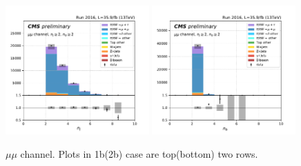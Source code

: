 \begin{figure}[ht]
    \includegraphics[width=0.49\textwidth]{chapters/Appendix/sectionPlots/figures/kinematics_pickles/mumu/2b/mumu_2b_nJets.pdf}
    \includegraphics[width=0.49\textwidth]{chapters/Appendix/sectionPlots/figures/kinematics_pickles/mumu/2b/mumu_2b_nBJets.pdf}
    
    \caption{$\mu\mu$ channel. Plots in 1b(2b) case are top(bottom) two rows.}
\end{figure}


